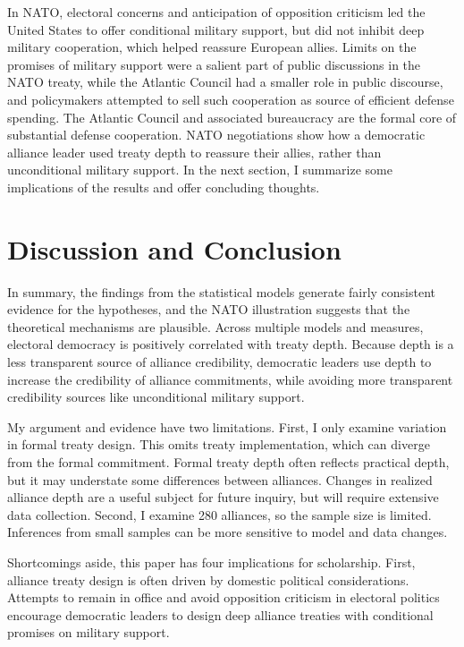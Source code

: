 \documentclass[12pt]{article}
\begin{document}
In NATO, electoral concerns and anticipation of opposition criticism led the United States to offer conditional military support, but did not inhibit deep military cooperation, which helped reassure European allies. 
Limits on the promises of military support were a salient part of public discussions in the NATO treaty, while the Atlantic Council had a smaller role in public discourse, and policymakers attempted to sell such cooperation as source of efficient defense spending. 
The Atlantic Council and associated bureaucracy are the formal core of substantial defense cooperation. 
NATO negotiations show how a democratic alliance leader used treaty depth to reassure their allies, rather than unconditional military support. 
In the next section, I summarize some implications of the results and offer concluding thoughts. 



\section{Discussion and Conclusion} 


In summary, the findings from the statistical models generate fairly consistent evidence for the hypotheses, and the NATO illustration suggests that the theoretical mechanisms are plausible. 
Across multiple models and measures, electoral democracy is positively correlated with treaty depth.  
Because depth is a less transparent source of alliance credibility, democratic leaders use depth to increase the credibility of alliance commitments, while avoiding more transparent credibility sources like unconditional military support.


My argument and evidence have two limitations.
First, I only examine variation in formal treaty design. 
This omits treaty implementation, which can diverge from the formal commitment.   
Formal treaty depth often reflects practical depth, but it may understate some differences between alliances. 
Changes in realized alliance depth are a useful subject for future inquiry, but will require extensive data collection.
Second, I examine 280 alliances, so the sample size is limited. 
Inferences from small samples can be more sensitive to model and data changes. 


Shortcomings aside, this paper has four implications for scholarship. 
First, alliance treaty design is often driven by domestic political considerations. 
Attempts to remain in office and avoid opposition criticism in electoral politics encourage democratic leaders to design deep alliance treaties with conditional promises on military support. 
\end{document}
